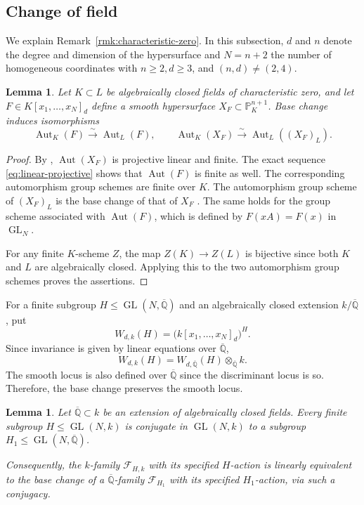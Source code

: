 \documentclass[12pt]{amsart}
\numberwithin{equation}{section}
\theoremstyle{plain}
\newtheorem{lem}[thm]{Lemma}
\theoremstyle{definition}
\theoremstyle{remark}
\newcommand{\PP}{\mathbb P}
\newcommand{\calF}{\mathcal F}
\DeclareMathOperator{\Aut}{Aut}
\DeclareMathOperator{\GL}{GL}
\begin{document}
\subsection{Change of field}
\label{subsec:change-of-ground-field}

We explain Remark~\ref{rmk:characteristic-zero}.
In this subsection, \(d\) and \(n\) denote
the degree and dimension of the hypersurface and \(N=n+2\) the number of
homogeneous coordinates with
 $n\geq2, d\geq3$, and $(n,d)\neq (2,4)$.

\begin{lem}\label{lem:automorphisms-base-change}
Let \(K\subset L\) be algebraically closed fields of characteristic
zero, and let \(F\in K[x_1,\ldots,x_N]_d\) define a smooth
hypersurface \(X_F\subset\PP^{n+1}_K\). Base change induces
isomorphisms
\[
\Aut_K(F)\xrightarrow{\sim}\Aut_L(F),\qquad
\Aut_K(X_F)\xrightarrow{\sim}\Aut_L((X_F)_L).
\]
\end{lem}

\begin{proof}
By \cite[Theorem~1 and~2]{Matsumura1963OnTA}, \(\Aut(X_F)\) is projective linear
and finite.
The exact sequence \eqref{eq:linear-projective} shows that
\(\Aut(F)\) is finite as well. The corresponding
automorphism group schemes are finite over \(K\).
The automorphism group scheme of \((X_F)_L\) is the base change
of that of \(X_F\) \cite[Tag~0DTR]{stacks-project}.
The same holds for the group scheme associated with \(\Aut(F)\),
which is defined by \(F(xA)=F(x)\) in \(\GL_N\).

For any finite \(K\)-scheme \(Z\), the map \(Z(K)\to Z(L)\)
is bijective since both $K$ and $L$ are algebraically closed.
Applying this to the two automorphism group schemes
proves the assertions.
\end{proof}

For a finite subgroup \(H\leq\GL(N,\overline{\mathbb Q})\) and
an algebraically closed extension \(k/\overline{\mathbb Q}\), put
\[
 W_{d,k}(H)=\bigl(k[x_1,\ldots,x_N]_d\bigr)^H.
\]
Since invariance is given by linear equations over
\(\overline{\mathbb Q}\), \[W_{d,k}(H)=W_{d,\overline{\mathbb Q}}(H)
 \otimes_{\overline{\mathbb Q}}k.\]
The smooth locus is also defined over \(\overline{\mathbb Q}\) since the discriminant locus is so. Therefore, the base change preserves the smooth locus.

\begin{lem}
\label{lem:finite-group-action-descent}
Let \(\overline{\mathbb Q}\subset k\) be an extension of algebraically
closed fields. Every finite subgroup \(H\leq\GL(N,k)\) is conjugate
in \(\GL(N,k)\) to a subgroup
\(H_1\leq\GL(N,\overline{\mathbb Q})\).

Consequently, the $k$-family \(\calF_{H,k}\) with its specified
\(H\)-action is linearly equivalent to the base change of
a $\overline{\mathbb{Q}}$-family \(\calF_{H_1}\) with its specified \(H_1\)-action, via such a conjugacy.
\end{lem}
\end{document}
